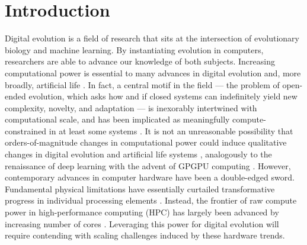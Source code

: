 \section{Introduction} \label{sec:introduction}

Digital evolution is a field of research that sits at the intersection of evolutionary biology and machine learning.
By instantiating evolution in computers, researchers are able to advance our knowledge of both subjects.
Increasing computational power is essential to many advances in digital evolution and, more broadly, artificial life \citep{ackley2014indefinitely}.
In fact, a central motif in the field --- the problem of open-ended evolution, which asks how and if closed systems can indefinitely yield new complexity, novelty, and adaptation --- is inexorably intertwined with computational scale, and has been implicated as meaningfully compute-constrained in at least some systems \citep{taylor2016open,channon2019maximum}.
It is not an unreasonable possibility that orders-of-magnitude changes in computational power could induce qualitative changes in digital evolution and artificial life systems \citep{moreno2022engineering}, analogously to the renaissance of deep learning with the advent of GPGPU computing \citep{krizhevsky2012imagenet}.
However, contemporary advances in computer hardware have been a double-edged sword.
Fundamental physical limitations have essentially curtailed transformative progress in individual processing elements \citep{sutter2005free}.
Instead, the frontier of raw compute power in high-performance computing (HPC) has largely been advanced by increasing number of cores \citep{morgenstern2021unparalleled}.
Leveraging this power for digital evolution will require contending with scaling challenges induced by these hardware trends.

